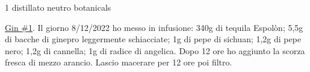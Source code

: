 \serves{-}%
\cooktime[]{-}%
\begin{ingreds}
	1 distillato neutro
	botanicals



\end{ingreds}

\begin{method}
\underline{Gin \#1}. Il giorno 8/12/2022 ho messo in infusione: 340g di tequila Espolòn; 5,5g di bacche di ginepro leggermente schiacciate; 1g di pepe di sichuan; 1,2g di pepe nero; 1,2g di cannella; 1g di radice di angelica. Dopo 12 ore ho aggiunto la scorza fresca di mezzo arancio. Lascio macerare per 12 ore poi filtro.



\end{method}




